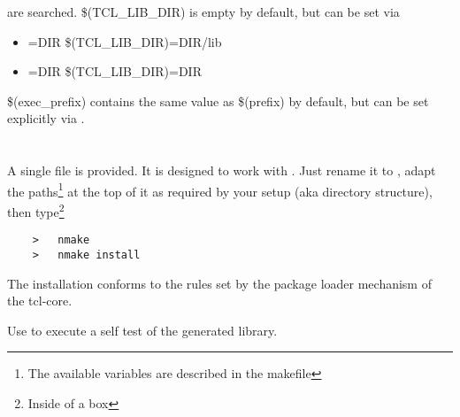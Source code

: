 \documentclass {report}
\begin{document}
\begin {itemize}
	are searched. \$(TCL\_LIB\_DIR) is empty by default, but
	can be set via

	\begin {itemize}
	\item[]	=DIR	      \ra {} \$(TCL\_LIB\_DIR)=DIR/lib
	\item[]	=DIR \ra {} \$(TCL\_LIB\_DIR)=DIR
	\end {itemize}

	\$(exec\_prefix) contains the same value as \$(prefix) by
	default, but can be set explicitly via .
\end {itemize}



\section {\win{}}

A single file  is provided. It is designed to
work with . Just rename it to , adapt
the paths\footnote {The available variables are described in the
makefile} at the top of it as required by your setup (aka directory
structure), then type\footnote {Inside of a \dos {} box}

\begin{verbatim}
	>	nmake
	>	nmake install
\end{verbatim}


The installation conforms to the rules set by the package loader
mechanism of the tcl-core.

Use  to execute a self test of the generated library.
\end{document}
